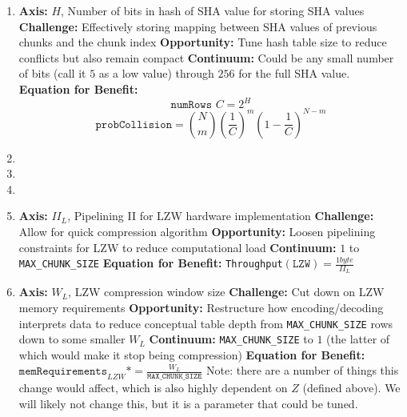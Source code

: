 \documentclass{article}
\begin{document}
\begin{enumerate}
\item%

\textbf{Axis:} $H$, Number of bits in hash of SHA value for storing SHA values
\newline
\textbf{Challenge:} Effectively storing mapping between SHA values of previous chunks and the chunk index
\newline
\textbf{Opportunity:} Tune hash table size to reduce conflicts but also remain compact
\newline
\textbf{Continuum:} Could be any small number of bits (call it $5$ as a low value) through $256$ for the full SHA value.
\newline
\textbf{Equation for Benefit:}
\[
\texttt{numRows }C=2^H
\]
\[
\texttt{probCollision}={N \choose m}\left(\frac{1}{C}\right)^m \left(1 - \frac{1}{C}\right)^{N-m}
\]

\item%



\item%


\item%


\item%

\textbf{Axis:} $II_L$, Pipelining II for LZW hardware implementation
\newline
\textbf{Challenge:} Allow for quick compression algorithm
\newline
\textbf{Opportunity:} Loosen pipelining constraints for LZW to reduce computational load
\newline
\textbf{Continuum:} $1$ to \texttt{MAX\_CHUNK\_SIZE}
\newline
\textbf{Equation for Benefit:} \texttt{Throughput}$\left(\texttt{LZW}\right)=\frac{1 byte}{II_L}$

\item%

\textbf{Axis:} $W_L$, LZW compression window size
\newline
\textbf{Challenge:} Cut down on LZW memory requirements
\newline
\textbf{Opportunity:} Restructure how encoding/decoding interprets data to reduce conceptual table depth from \texttt{MAX\_CHUNK\_SIZE} rows down to some smaller $W_L$
\newline
\textbf{Continuum:} \texttt{MAX\_CHUNK\_SIZE} to $1$ (the latter of which would make it stop being compression)
\newline
\textbf{Equation for Benefit:} $\texttt{memRequirements}_{LZW} *= \frac{W_L}{\texttt{MAX\_CHUNK\_SIZE}}$\newline
Note: there are a number of things this change would affect, which is also highly dependent on $Z$ (defined above). We will likely not change this, but it is a parameter that could be tuned.


\end{enumerate}
\end{document}
